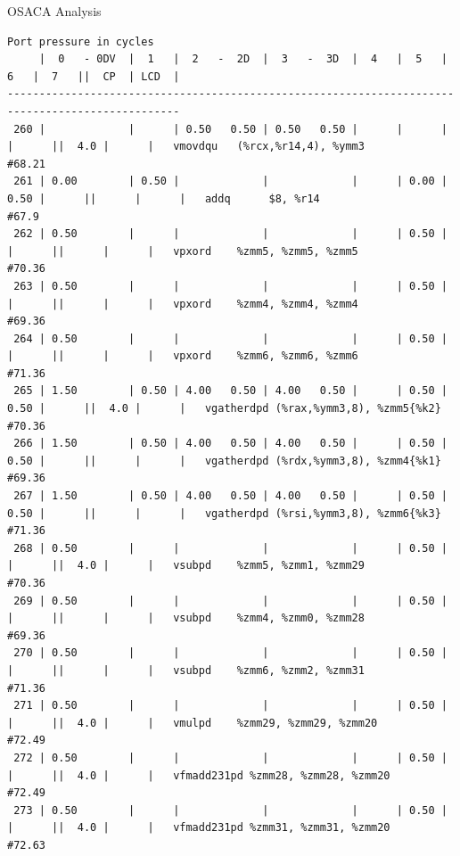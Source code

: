 \documentclass[aspectratio=43,t]{beamer}
\begin{document}
  \begin{frame}[fragile]{OSACA Analysis}
    \begin{lstlisting}[basicstyle=\tt\tiny]
                                     Port pressure in cycles                                     
     |  0   - 0DV  |  1   |  2   -  2D  |  3   -  3D  |  4   |  5   |  6   |  7   ||  CP  | LCD  |
-------------------------------------------------------------------------------------------------
 260 |             |      | 0.50   0.50 | 0.50   0.50 |      |      |      |      ||  4.0 |      |   vmovdqu   (%rcx,%r14,4), %ymm3                          #68.21
 261 | 0.00        | 0.50 |             |             |      | 0.00 | 0.50 |      ||      |      |   addq      $8, %r14                                      #67.9
 262 | 0.50        |      |             |             |      | 0.50 |      |      ||      |      |   vpxord    %zmm5, %zmm5, %zmm5                           #70.36
 263 | 0.50        |      |             |             |      | 0.50 |      |      ||      |      |   vpxord    %zmm4, %zmm4, %zmm4                           #69.36
 264 | 0.50        |      |             |             |      | 0.50 |      |      ||      |      |   vpxord    %zmm6, %zmm6, %zmm6                           #71.36
 265 | 1.50        | 0.50 | 4.00   0.50 | 4.00   0.50 |      | 0.50 | 0.50 |      ||  4.0 |      |   vgatherdpd (%rax,%ymm3,8), %zmm5{%k2}                   #70.36
 266 | 1.50        | 0.50 | 4.00   0.50 | 4.00   0.50 |      | 0.50 | 0.50 |      ||      |      |   vgatherdpd (%rdx,%ymm3,8), %zmm4{%k1}                   #69.36
 267 | 1.50        | 0.50 | 4.00   0.50 | 4.00   0.50 |      | 0.50 | 0.50 |      ||      |      |   vgatherdpd (%rsi,%ymm3,8), %zmm6{%k3}                   #71.36
 268 | 0.50        |      |             |             |      | 0.50 |      |      ||  4.0 |      |   vsubpd    %zmm5, %zmm1, %zmm29                          #70.36
 269 | 0.50        |      |             |             |      | 0.50 |      |      ||      |      |   vsubpd    %zmm4, %zmm0, %zmm28                          #69.36
 270 | 0.50        |      |             |             |      | 0.50 |      |      ||      |      |   vsubpd    %zmm6, %zmm2, %zmm31                          #71.36
 271 | 0.50        |      |             |             |      | 0.50 |      |      ||  4.0 |      |   vmulpd    %zmm29, %zmm29, %zmm20                        #72.49
 272 | 0.50        |      |             |             |      | 0.50 |      |      ||  4.0 |      |   vfmadd231pd %zmm28, %zmm28, %zmm20                      #72.49
 273 | 0.50        |      |             |             |      | 0.50 |      |      ||  4.0 |      |   vfmadd231pd %zmm31, %zmm31, %zmm20                      #72.63

\end{lstlisting}
\end{frame}
\end{document}
